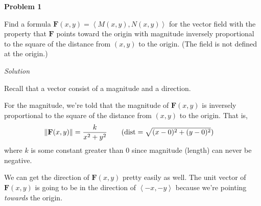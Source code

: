 \documentclass{article}
\newcommand{\lra}[1]{\left\langle #1 \right\rangle}
\newcommand{\norm}[1]{\left\lVert #1 \right\rVert}
\newcommand{\F}[0]{\mathbf{F}}
\newcommand{\Solution}{\textit{Solution}}
\begin{document}
{}\textbf{Problem 1}

Find a formula $\F(x,y)=\lra{M(x,y), N(x,y)}$ for the vector field with the property that $\F$ points toward the origin with magnitude inversely proportional to the square of the
distance from $(x, y)$ to the origin. (The field is not defined at the origin.)

\Solution

Recall that a vector consist of a magnitude and a direction.

For the magnitude, we're told that the magnitude of $\F(x,y)$ is inversely proportional to the square of the distance from $(x,y)$ to the origin. That is,
\begin{align*}
    \norm{\F(x,y)}&=\frac{k}{x^2+y^2}\tag{$\text{dist}=\sqrt{(x-0)^2+(y-0)^2}$}
\end{align*}
where $k$ is some constant greater than $0$ since magnitude (length) can never be negative.

We can get the direction of $\F(x,y)$ pretty easily as well. The unit vector of $\F(x,y)$ is going to be in the direction of $\lra{-x,-y}$ because we're pointing \textit{towards} the origin. 
\end{document}
